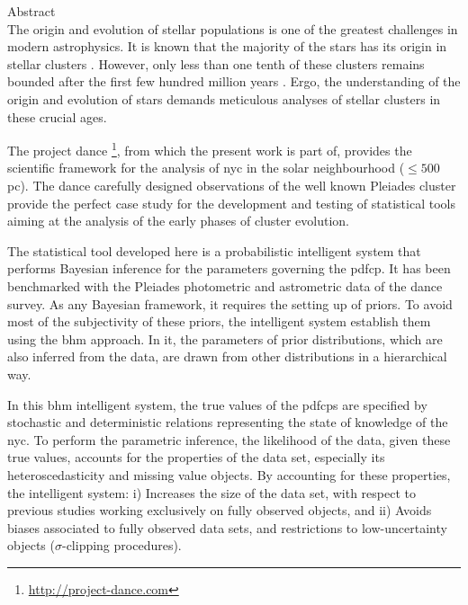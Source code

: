 

{\LARGE Abstract}\\

The origin and evolution of stellar populations is one of the greatest challenges in modern astrophysics. It is known that the majority of the stars has its origin in stellar clusters \citep{2000AJ....120.3139C, 2003AJ....126.1916P,2003ARA&A..41...57L}. However, only less than one tenth of these clusters remains bounded after the first few hundred million years \citep{2003ARA&A..41...57L}. Ergo, the understanding of the origin and evolution of stars demands meticulous analyses of stellar clusters in these crucial ages.

The project \gls{dance} \footnote{\url{http://project-dance.com}}, from which the present work is part of, provides the scientific framework for the analysis of \gls{nyc} in the solar neighbourhood ($\leq 500$ pc). The \gls{dance} carefully designed observations of the well known Pleiades cluster provide the perfect case study for the development and testing of statistical tools aiming at the analysis of the early phases of cluster evolution.

The statistical tool developed here is a probabilistic intelligent system that performs Bayesian inference for the parameters governing the \gls{pdfcp}. It has been benchmarked with the Pleiades photometric and astrometric data of the \gls{dance} survey. As any Bayesian framework, it requires the setting up of priors. To avoid most of the subjectivity of these priors, the intelligent system establish them using the \gls{bhm} approach. In it, the parameters of prior distributions, which are also inferred from the data, are drawn from other distributions in a hierarchical way. 

In this \gls{bhm} intelligent system, the true values of the \glspl{pdfcp} are specified by stochastic and deterministic relations representing the state of knowledge of the \gls{nyc}. To perform the parametric inference, the likelihood of the data, given these true values, accounts for the properties of the data set, especially its heteroscedasticity and missing value objects. By accounting for these properties, the intelligent system: i) Increases the size of the data set, with respect to previous studies working exclusively on fully observed objects, and ii) Avoids biases associated to fully observed data sets, and restrictions to low-uncertainty objects ($\sigma$-clipping procedures).

